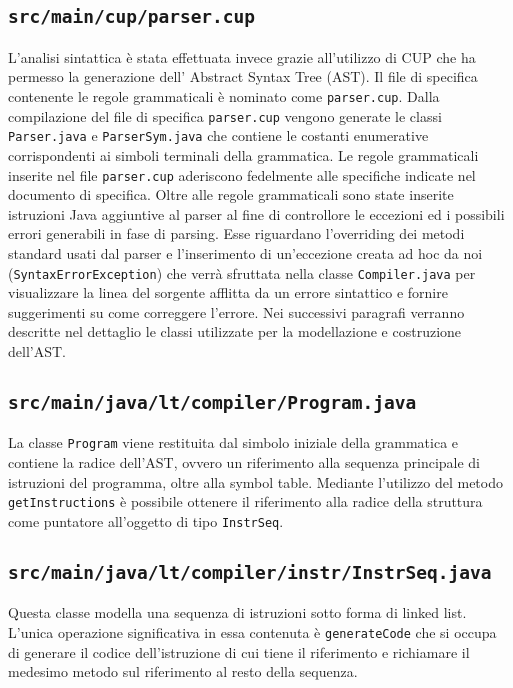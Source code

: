 \documentclass[10pt,a4paper]{article}
\begin{document}
\subsection{\texttt{src/main/cup/parser.cup}}
L'analisi sintattica è stata effettuata invece grazie all'utilizzo di CUP che ha permesso la generazione dell' Abstract Syntax Tree (AST). Il file di specifica contenente le regole grammaticali è nominato come \texttt{parser.cup}. Dalla compilazione del file di specifica \texttt{parser.cup} vengono generate le classi \texttt{Parser.java} e \texttt{ParserSym.java} che contiene le costanti enumerative corrispondenti ai simboli terminali della grammatica.
Le regole grammaticali inserite nel file \texttt{parser.cup} aderiscono fedelmente alle specifiche indicate nel documento di specifica. Oltre alle regole grammaticali sono state inserite istruzioni Java aggiuntive al parser al fine di controllore le eccezioni ed i possibili errori generabili in fase di parsing.
Esse riguardano l'overriding dei metodi standard usati dal parser e l'inserimento di un'eccezione creata ad hoc da noi (\texttt{SyntaxErrorException}) che verrà sfruttata nella classe \texttt{Compiler.java} per visualizzare la linea del sorgente afflitta da un errore sintattico e fornire suggerimenti su come correggere l'errore. Nei successivi paragrafi verranno descritte nel dettaglio le classi utilizzate per la modellazione e costruzione dell'AST.

\subsection{\texttt{src/main/java/lt/compiler/Program.java}}
La classe \texttt{Program} viene restituita dal simbolo iniziale della grammatica e contiene la radice dell'AST, ovvero un riferimento alla sequenza principale di istruzioni del programma, oltre alla symbol table. Mediante l'utilizzo del metodo \texttt{getInstructions} è possibile ottenere il riferimento alla radice della struttura come puntatore all'oggetto di tipo \texttt{InstrSeq}.

\subsection{\texttt{src/main/java/lt/compiler/instr/InstrSeq.java}}
Questa classe modella una sequenza di istruzioni sotto forma di linked list. L'unica operazione significativa in essa contenuta è \texttt{generateCode} che si occupa di generare il codice dell'istruzione di cui tiene il riferimento e richiamare il medesimo metodo sul riferimento al resto della sequenza.
\end{document}
